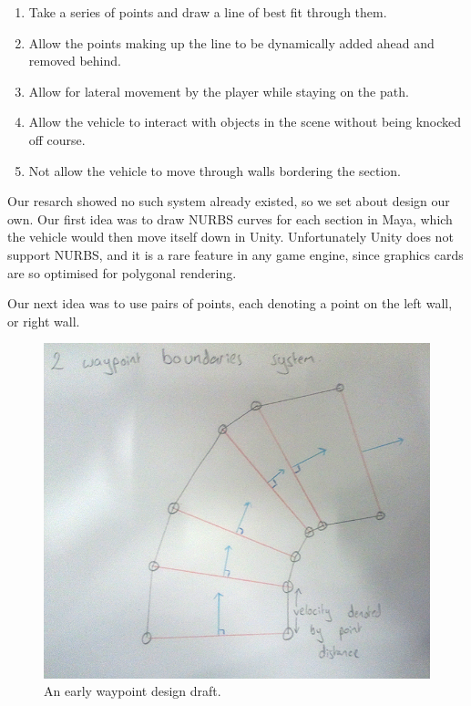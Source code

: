 \documentclass[a4paper,oneside]{memoir}
\begin{document}
				\begin{enumerate}
					\item Take a series of points and draw a line of best fit through them.
					\item Allow the points making up the line to be dynamically added ahead and removed behind.
					\item Allow for lateral movement by the player while staying on the path.
					\item Allow the vehicle to interact with objects in the scene without being knocked off course.
					\item Not allow the vehicle to move through walls bordering the section.
				\end{enumerate}

			Our resarch showed no such system already existed, so we set about design our own. Our first idea was to draw NURBS curves for each section in Maya, which the vehicle would then move itself down in Unity. Unfortunately Unity does not support NURBS, and it is a rare feature in any game engine, since graphics cards are so optimised for polygonal rendering.

			Our next idea was to use pairs of points, each denoting a point on the left wall, or right wall.

			\begin{figure}[ht]
				\begin{center}
					\includegraphics[width=120mm]{"../Screenshots/Early Research/proposed-waypoints"}
					\caption{An early waypoint design draft.}
					\label{fig:Early waypoint system draft}
				\end{center}
			\end{figure}
\end{document}
